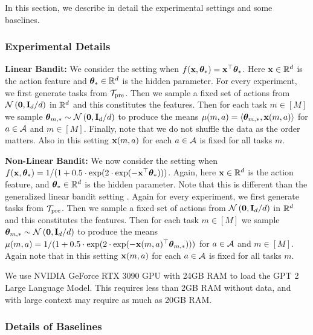 In this section, we describe in detail the experimental settings and some baselines.

\subsubsection{Experimental Details}

\textbf{Linear Bandit:} We consider the setting when $f(\mathbf{x}, \boldsymbol{\theta}_*) = \mathbf{x}^\top\boldsymbol{\theta}_*$. Here $\mathbf{x} \in \mathbb{R}^d$ is the action feature and $\boldsymbol{\theta}_*\in\mathbb{R}^d$ is the hidden parameter. 
%
For every experiment, we first generate tasks from $\mathcal{T}_{\text{pre}}$. Then we sample a fixed set of actions from  $\mathcal{N}\left(\mathbf{0}, \mathbf{I}_d / d\right)$ in $\mathbb{R}^d$ and this constitutes the features. 
%
Then for each task $m\in [M]$ we sample $\boldsymbol{\theta}_{m ,*} \sim \mathcal{N}\left(\mathbf{0}, \mathbf{I}_d / d\right)$ to produce the means $\mu(m,a)=\left\langle\boldsymbol{\theta}_{m ,*}, \mathbf{x}(m,a)\right\rangle$ for $a \in \mathcal{A}$ and $m\in [M]$.
%
Finally, note that we do not shuffle the data as the order matters. Also in this setting $\mathbf{x}(m, a)$ for each $a\in\mathcal{A}$ is fixed for all tasks $m$.



\textbf{Non-Linear Bandit:} We now consider the setting when $f(\mathbf{x}, \boldsymbol{\theta}_*) = 1/(1 + 0.5\cdot\exp(2\cdot\exp(- \mathbf{x}^\top \boldsymbol{\theta}_*)))$. Again, here $\mathbf{x} \in \mathbb{R}^d$ is the action feature, and $\boldsymbol{\theta}_*\in\mathbb{R}^d$ is the hidden parameter. 
%
Note that this is different than the generalized linear bandit setting \citep{filippi2010parametric, li2017provably}.
%
Again for every experiment, we first generate tasks from $\mathcal{T}_{\text{pre}}$. Then we sample a fixed set of actions from  $\mathcal{N}\left(\mathbf{0}, \mathbf{I}_d / d\right)$ in $\mathbb{R}^d$ and this constitutes the features. 
%
Then for each task $m\in [M]$ we sample $\boldsymbol{\theta}_{m ,*} \sim \mathcal{N}\left(\mathbf{0}, \mathbf{I}_d / d\right)$ to produce the means $\mu(m,a)=1/(1 + 0.5\cdot\exp(2\cdot\exp(- \mathbf{x}(m,a)^\top \boldsymbol{\theta}_{m,*})))$ for $a \in \mathcal{A}$ and $m\in [M]$.
%
Again note that in this setting $\mathbf{x}(m, a)$ for each $a\in\mathcal{A}$ is fixed for all tasks $m$.


We use NVIDIA GeForce RTX 3090 GPU with 24GB RAM to load the GPT 2 Large Language Model. This requires less than 2GB RAM without data, and with large context may require as much as 20GB RAM.

\subsubsection{Details of Baselines}
\label{app:baseline-details}

